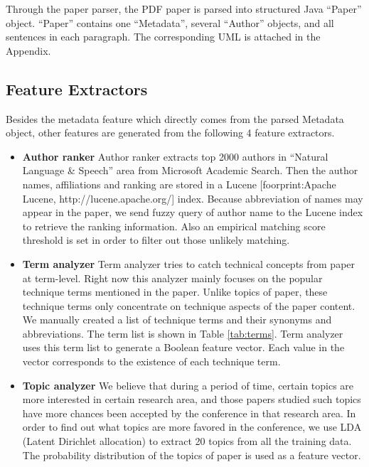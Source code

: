 \documentclass[11pt,letterpaper]{article}
\begin{document}
Through the paper parser, the PDF paper is parsed into structured Java ``Paper'' object. ``Paper'' contains one ``Metadata'', several ``Author'' objects, and all sentences in each paragraph. The corresponding UML is attached in the Appendix.


\subsection{Feature Extractors}
Besides the metadata feature which directly comes from the parsed Metadata object, other features are generated from the following 4 feature extractors. 

\begin{itemize} 
\item {\bf Author ranker}
Author ranker extracts top 2000 authors in ``Natural Language \& Speech'' area from Microsoft Academic Search. Then the author names, affiliations and ranking are stored in a Lucene [foorprint:Apache Lucene, http://lucene.apache.org/] index. Because abbreviation of names may appear in the paper, we send fuzzy query of author name to the Lucene index to retrieve the ranking information. Also an empirical matching score threshold is set in order to filter out those unlikely matching. 


\item {\bf Term analyzer}
Term analyzer tries to catch technical concepts from paper at term-level. Right now this analyzer mainly focuses on the popular technique terms mentioned in the paper. Unlike topics of paper, these technique terms only concentrate on technique aspects of the paper content. We manually created a list of technique terms and their synonyms and abbreviations. 
The term list is shown in Table \ref{tab:terms}.
Term analyzer uses this term list to generate a Boolean feature vector. Each value in the vector corresponds to the existence of each technique term.








\item	{\bf Topic analyzer}
We believe that during a period of time, certain topics are more interested in certain research area, and those papers studied such topics have more chances been accepted by the conference in that research area. In order to find out what topics are more favored in the conference, we use LDA (Latent Dirichlet allocation) to extract 20 topics from all the training data. The probability distribution of the topics of paper is used as a feature vector. 


\end{itemize}
\end{document}
